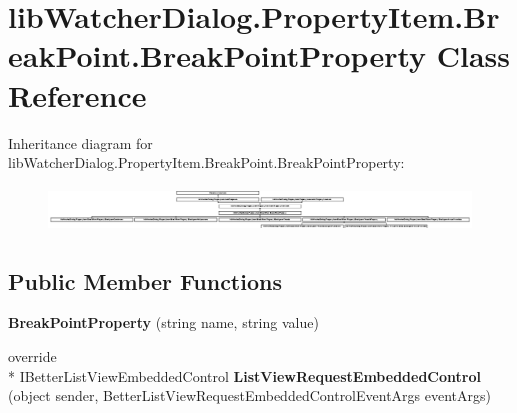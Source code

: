 \hypertarget{classlib_watcher_dialog_1_1_property_item_1_1_break_point_1_1_break_point_property}{\section{lib\+Watcher\+Dialog.\+Property\+Item.\+Break\+Point.\+Break\+Point\+Property Class Reference}
\label{classlib_watcher_dialog_1_1_property_item_1_1_break_point_1_1_break_point_property}
}
Inheritance diagram for lib\+Watcher\+Dialog.\+Property\+Item.\+Break\+Point.\+Break\+Point\+Property\+:\begin{figure}[H]
\begin{center}
\leavevmode
\includegraphics[height=1.215190cm]{classlib_watcher_dialog_1_1_property_item_1_1_break_point_1_1_break_point_property}
\end{center}
\end{figure}
\subsection*{Public Member Functions}
\begin{DoxyCompactItemize}
\item 
\hypertarget{classlib_watcher_dialog_1_1_property_item_1_1_break_point_1_1_break_point_property_a4524ac2824c1e2720318818e4c855e95}{{\bfseries Break\+Point\+Property} (string name, string value)}\label{classlib_watcher_dialog_1_1_property_item_1_1_break_point_1_1_break_point_property_a4524ac2824c1e2720318818e4c855e95}

\item 
\hypertarget{classlib_watcher_dialog_1_1_property_item_1_1_break_point_1_1_break_point_property_a417506fe3f21cfdb64500a13d307dcad}{override \\*
I\+Better\+List\+View\+Embedded\+Control {\bfseries List\+View\+Request\+Embedded\+Control} (object sender, Better\+List\+View\+Request\+Embedded\+Control\+Event\+Args event\+Args)}\label{classlib_watcher_dialog_1_1_property_item_1_1_break_point_1_1_break_point_property_a417506fe3f21cfdb64500a13d307dcad}

\end{DoxyCompactItemize}
